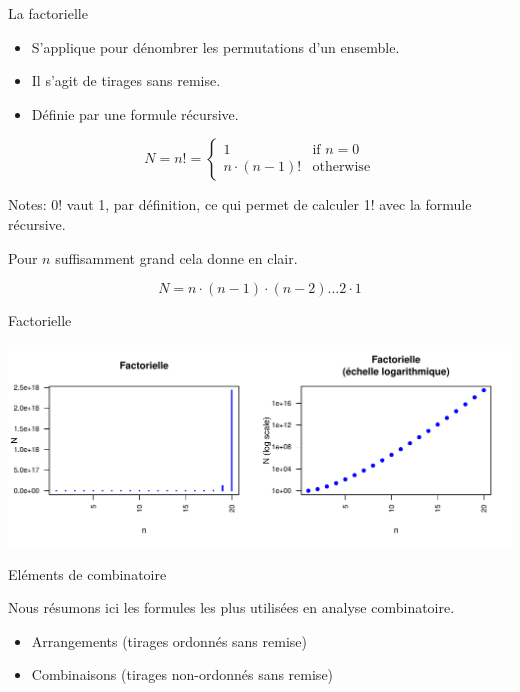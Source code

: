 \documentclass[ignorenonframetext,]{beamer}
\providecommand{\tightlist}{%
  \setlength{\itemsep}{0pt}\setlength{\parskip}{0pt}}
\begin{document}
\begin{frame}{La factorielle}
\protect\hypertarget{la-factorielle}{}

\begin{itemize}
\tightlist
\item
  S'applique pour dénombrer les permutations d'un ensemble.
\item
  Il s'agit de tirages sans remise.
\item
  Définie par une formule récursive.
\end{itemize}

\[N = n! = \left\{
                \begin{array}{ll}
                  1 & \text{if } n=0 \\
                  n \cdot (n-1)! &\text{otherwise}
                \end{array}
              \right.\]

Notes: 0! vaut 1, par définition, ce qui permet de calculer 1! avec la
formule récursive.

Pour \(n\) suffisamment grand cela donne en clair.

\[N = n \cdot (n-1) \cdot (n-2) \ldots 2 \cdot 1\]

\end{frame}

\begin{frame}{Factorielle}
\protect\hypertarget{factorielle}{}

\begin{center}\includegraphics[width=0.95\linewidth]{figures/02_combinatorix_factorielle-1} \end{center}

\end{frame}

\begin{frame}{Eléments de combinatoire}
\protect\hypertarget{elements-de-combinatoire}{}

Nous résumons ici les formules les plus utilisées en analyse
combinatoire.

\begin{itemize}
\tightlist
\item
  Arrangements (tirages ordonnés sans remise)
\item
  Combinaisons (tirages non-ordonnés sans remise)
\end{itemize}

\end{frame}
\end{document}
